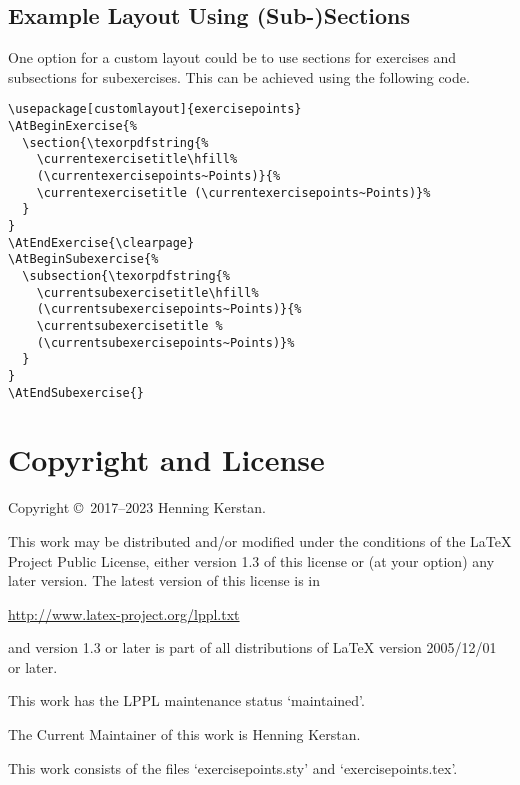 \documentclass[
  twocolumn,%
  fontsize=9pt,%
  DIV=calc,%
  numbers=noendperiod%
]{scrartcl}
\begin{document}
\subsection{Example Layout Using (Sub-)Sections}
One option for a custom layout could be to use sections for exercises and subsections for subexercises. This can be achieved using the following code.

\begin{lstlisting}
\usepackage[customlayout]{exercisepoints}
\AtBeginExercise{%
  \section{\texorpdfstring{%
    \currentexercisetitle\hfill%
    (\currentexercisepoints~Points)}{%
    \currentexercisetitle (\currentexercisepoints~Points)}%
  }
}
\AtEndExercise{\clearpage}
\AtBeginSubexercise{%
  \subsection{\texorpdfstring{%
    \currentsubexercisetitle\hfill%
    (\currentsubexercisepoints~Points)}{%
    \currentsubexercisetitle %
    (\currentsubexercisepoints~Points)}%
  }
}
\AtEndSubexercise{}
\end{lstlisting}

\section{Copyright and License}
Copyright \copyright\ 2017--2023 Henning Kerstan.\medskip

\noindent This work may be distributed and/or modified under the conditions of the LaTeX Project Public License, either version 1.3 of this license or (at your option) any later version. The latest version of this license is in\medskip

   \url{http://www.latex-project.org/lppl.txt}\medskip

\noindent and version 1.3 or later is part of all distributions of LaTeX version 2005/12/01 or later.\medskip

\noindent This work has the LPPL maintenance status `maintained'.\medskip

\noindent The Current Maintainer of this work is Henning Kerstan.\medskip

\noindent This work consists of the files `exercisepoints.sty' and `exercisepoints.tex'.
\end{document}
